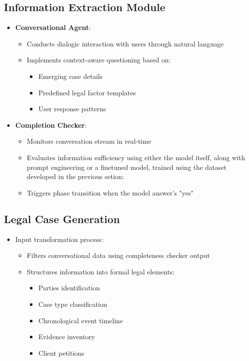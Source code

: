 \subsection{Information Extraction Module}
\begin{itemize}
    \item \textbf{Conversational Agent}:
    \begin{itemize}
        \item Conducts dialogic interaction with users through natural language
        \item Implements context-aware questioning based on:
        \begin{itemize}
            \item Emerging case details
            \item Predefined legal factor templates
            \item User response patterns
        \end{itemize}
    \end{itemize}
    
    \item \textbf{Completion Checker}:
    \begin{itemize}
        \item Monitors conversation stream in real-time
        \item Evaluates information sufficiency using either the model itself, 
        along with prompt engineering or a finetuned model, 
        trained using the dataset developed in the previous setion:
        \item Triggers phase transition when the model answer's "yes"
    \end{itemize}
\end{itemize}

\subsection{Legal Case Generation}
\begin{itemize}
    \item Input transformation process:
    \begin{itemize}
        \item Filters conversational data using completeness checker output
        \item Structures information into formal legal elements:
        \begin{itemize}
            \item Parties identification
            \item Case type classification
            \item Chronological event timeline
            \item Evidence inventory
            \item Client petitions
        \end{itemize}
    \end{itemize}
\end{itemize}

